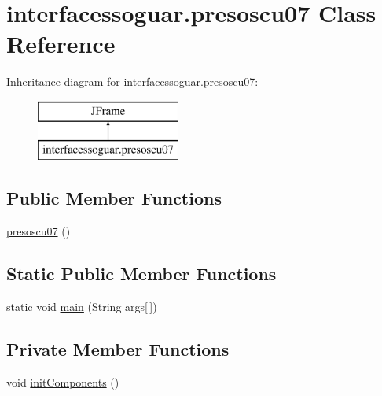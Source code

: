 \hypertarget{classinterfacessoguar_1_1presoscu07}{}\section{interfacessoguar.\+presoscu07 Class Reference}
\label{classinterfacessoguar_1_1presoscu07}
Inheritance diagram for interfacessoguar.\+presoscu07\+:\begin{figure}[H]
\begin{center}
\leavevmode
\includegraphics[height=2.000000cm]{classinterfacessoguar_1_1presoscu07}
\end{center}
\end{figure}
\subsection*{Public Member Functions}
\begin{DoxyCompactItemize}
\item 
\mbox{\hyperlink{classinterfacessoguar_1_1presoscu07_ae655471017f46460a1310a594fec8065}{presoscu07}} ()
\end{DoxyCompactItemize}
\subsection*{Static Public Member Functions}
\begin{DoxyCompactItemize}
\item 
static void \mbox{\hyperlink{classinterfacessoguar_1_1presoscu07_a1e62109b02970a7d7621d3615c668932}{main}} (String args\mbox{[}$\,$\mbox{]})
\end{DoxyCompactItemize}
\subsection*{Private Member Functions}
\begin{DoxyCompactItemize}
\item 
void \mbox{\hyperlink{classinterfacessoguar_1_1presoscu07_a3da6d5c21e9ab466a2b34f44bb664f70}{init\+Components}} ()
\end{DoxyCompactItemize}
